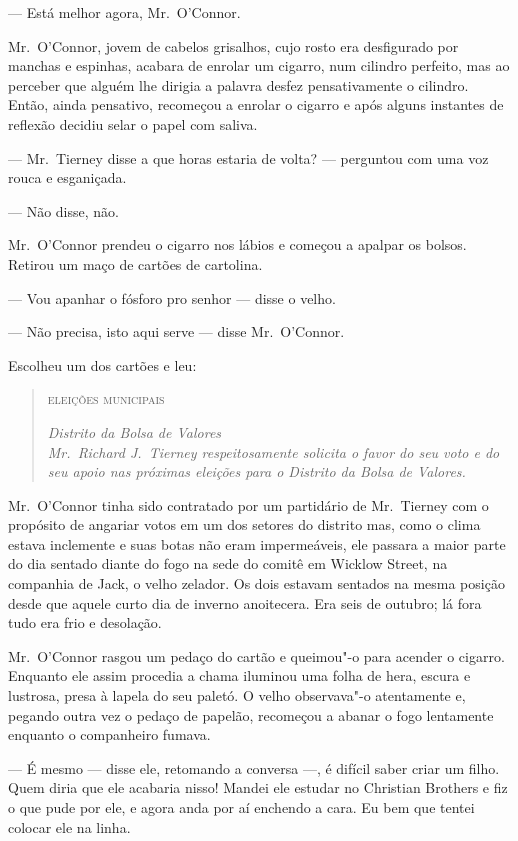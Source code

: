 --- Está melhor agora, Mr.~O’Connor.

Mr.~O’Connor, jovem de cabelos grisalhos, cujo rosto era desfigurado por
manchas e espinhas, acabara de enrolar um cigarro, num cilindro perfeito, mas
ao perceber que alguém lhe dirigia a palavra desfez pensativamente o cilindro.
Então, ainda pensativo, recomeçou a enrolar o cigarro e após alguns instantes
de reflexão decidiu selar o papel com saliva.

--- Mr.~Tierney disse a que horas estaria de volta? --- perguntou com uma voz
rouca e esganiçada.

--- Não disse, não.

Mr.~O’Connor prendeu o cigarro nos lábios e começou a apalpar os bolsos.
Retirou um maço de cartões de cartolina.

--- Vou apanhar o fósforo pro senhor --- disse o velho.

--- Não precisa, isto aqui serve --- disse Mr.~O’Connor.

Escolheu um dos cartões e leu:

\clearpage

\begin{quote}\centering
\textsc{eleições municipais}\smallskip

\textit{Distrito da Bolsa de Valores}\\
\textit{Mr.~Richard J.~Tierney respeitosamente solicita o favor do
seu voto e do seu apoio nas próximas eleições para o Distrito da
Bolsa de Valores.}
\end{quote}

Mr.~O’Connor tinha sido contratado por um partidário de Mr.~Tierney com o
propósito de angariar votos em um dos setores do distrito mas, como o clima
estava inclemente e suas botas não eram impermeáveis, ele passara a maior parte
do dia sentado diante do fogo na sede do comitê em Wicklow Street, na companhia
de Jack, o velho zelador.  Os dois estavam sentados na mesma posição desde que
aquele curto dia de inverno anoitecera.  Era seis de outubro; lá fora tudo era
frio e desolação.

Mr.~O’Connor rasgou um pedaço do cartão e queimou"-o para acender o cigarro.
Enquanto ele assim procedia a chama iluminou uma folha de hera, escura e
lustrosa, presa à lapela do seu paletó.  O velho observava"-o atentamente e,
pegando outra vez o pedaço de papelão, recomeçou a abanar o fogo lentamente
enquanto o companheiro fumava.

--- É mesmo --- disse ele, retomando a conversa ---, é difícil saber criar um
filho.  Quem diria que ele acabaria nisso!  Mandei ele estudar no Christian
Brothers e fiz o que pude por ele, e agora anda por aí enchendo a cara.  Eu bem
que tentei colocar ele na linha.

